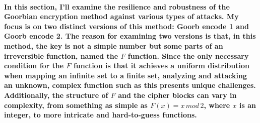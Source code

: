 \documentclass[oneside]{book}
\newcommand{\myparagraph}[1]{\paragraph{\textnormal{#1}}}
\begin{document}
\myparagraph{
In this section, I'll examine the resilience and robustness of the Goorbian encryption method against various types of attacks. My focus is on two distinct versions of this method: \textbf{Goorb encode 1} and \textbf{Goorb encode 2}. The reason for examining two versions is that, in this method, the key is not a simple number but some parts of an irreversible function, named the $F$ function. Since the only necessary condition for the $F$ function is that it achieves a uniform distribution when mapping an infinite set to a finite set, analyzing and attacking an unknown, complex function such as this presents unique challenges. Additionally, the structure of $F$ and the cipher blocks can vary in complexity, from something as simple as $F(x) = x \, mod \, 2$, where $x$ is an integer, to more intricate and hard-to-guess functions.
}
\end{document}
